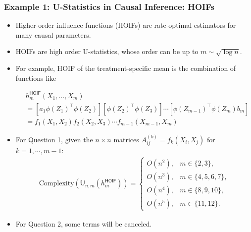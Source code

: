 \documentclass[9pt]{beamer}
\theoremstyle{mystyle}
\theoremstyle{mystyletwo}
\begin{document}
\begin{frame}
    \frametitle{Example 1: U-Statistics in Causal Inference: HOIFs}
    \begin{itemize}
        \item Higher-order influence functions (HOIFs) \citep{robins2008higher, robins2016technical} are rate-optimal estimators for many causal parameters. 
        \item HOIFs are high order U-statistics, whose order can be up to $m \sim \sqrt{\log n}$.
        \item For example, HOIF of the treatment-specific mean is the combination of functions like
              
    \begin{tcolorbox}[colframe=blue!70!black, colback=blue!5, 
                  boxrule=1.0pt, arc=1mm, 
                  enhanced, breakable]
    \begin{align*}
      &  h^{\mathsf{HOIF}}_m(X_{1}, \ldots, X_{m}) \\
      & = [a_{{1}} \phi (Z_{{1}})^{\top} \phi(Z_{2})]  [\phi (Z_{{2}})^{\top} \phi(Z_{3})] \cdots [\phi(Z_{{m-1}})^\top \phi(Z_{m})b_{m}] \\
      & = f_1(X_{1},X_{2})  f_2(X_{2},X_{3}) \cdots f_{m-1}(X_{m-1},X_{m})
    \end{align*}
    \end{tcolorbox}

    \item For Question 1, given the $n \times n$ matrices $A^{(k)}_{ij} = f_k(X_i, X_j)$ for $k = 1, \cdots, m-1$:
    \begin{equation*}
    \begin{split}
    \mathrm{Complexity}(\mathbb{U}_{n,m}(h^{\mathsf{HOIF}}_m)) = \left\{ \begin{array}{ll}
    O(n^2), & m \in \{2, 3\}, \\
    O(n^3), & m \in \{4, 5, 6, 7\}, \\
    O(n^4), & m \in \{8, 9, 10\}, \\
    O(n^5), & m \in \{11, 12\}.
    \end{array} \right.
    \end{split}
    \end{equation*}
        
    \item For Question 2, some terms will be canceled.
    
    \end{itemize}

\end{frame}
\end{document}
